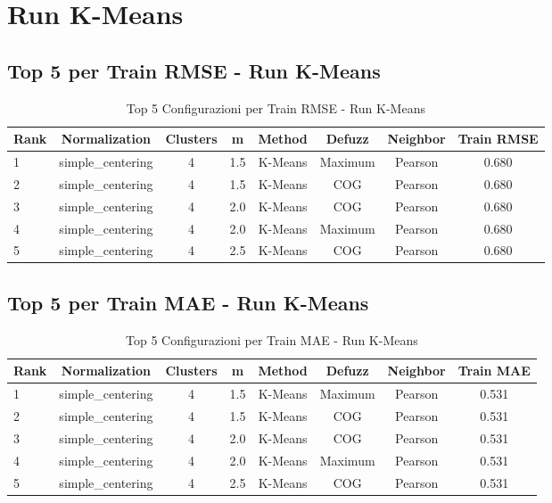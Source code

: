 \section{Run K-Means}

\subsection{Top 5 per Train RMSE - Run K-Means}
\begin{table}[h]
    \centering
    \caption{Top 5 Configurazioni per Train RMSE - Run K-Means}
    \begin{tabular}{|l|c|c|c|c|c|c|c|}
    \hline
    \textbf{Rank} & \textbf{Normalization} & \textbf{Clusters} & \textbf{m} & \textbf{Method} & \textbf{Defuzz} & \textbf{Neighbor} & \textbf{Train RMSE} \\
    \hline
    1 & simple\_centering & 4 & 1.5 & K-Means & Maximum & Pearson & 0.680 \\
    2 & simple\_centering & 4 & 1.5 & K-Means & COG & Pearson & 0.680 \\
    3 & simple\_centering & 4 & 2.0 & K-Means & COG & Pearson & 0.680 \\
    4 & simple\_centering & 4 & 2.0 & K-Means & Maximum & Pearson & 0.680 \\
    5 & simple\_centering & 4 & 2.5 & K-Means & COG & Pearson & 0.680 \\
    \hline
    \end{tabular}
    \end{table}

\subsection{Top 5 per Train MAE - Run K-Means}
\begin{table}[h]
    \centering
    \caption{Top 5 Configurazioni per Train MAE - Run K-Means}
    \begin{tabular}{|l|c|c|c|c|c|c|c|}
    \hline
    \textbf{Rank} & \textbf{Normalization} & \textbf{Clusters} & \textbf{m} & \textbf{Method} & \textbf{Defuzz} & \textbf{Neighbor} & \textbf{Train MAE} \\
    \hline
    1 & simple\_centering & 4 & 1.5 & K-Means & Maximum & Pearson & 0.531 \\
    2 & simple\_centering & 4 & 1.5 & K-Means & COG & Pearson & 0.531 \\
    3 & simple\_centering & 4 & 2.0 & K-Means & COG & Pearson & 0.531 \\
    4 & simple\_centering & 4 & 2.0 & K-Means & Maximum & Pearson & 0.531 \\
    5 & simple\_centering & 4 & 2.5 & K-Means & COG & Pearson & 0.531 \\
    \hline
    \end{tabular}
    \end{table}

